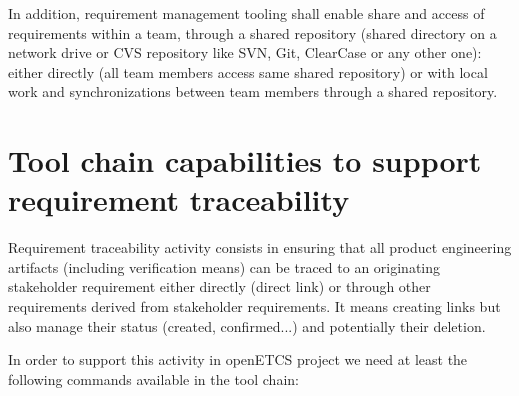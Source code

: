 \documentclass[11pt]{template/openetcs_report}
\begin{document}
In addition, requirement management tooling shall enable share and access of requirements within a team, through a shared repository (shared directory on a network drive or CVS repository like SVN, Git, ClearCase or any other one): either directly (all team members access same shared repository) or with local work and synchronizations between team members through a shared repository.

\section{Tool chain capabilities to support requirement traceability}
\label{sec-3-2}  
Requirement traceability activity consists in ensuring that all product engineering artifacts (including verification means) can be traced to an originating stakeholder requirement either directly (direct link) or through other requirements derived from stakeholder requirements. It means creating links but also manage their status (created, confirmed...) and potentially their deletion.

In order to support this activity in openETCS project we need at least the following commands available in the tool chain:
\end{document}
